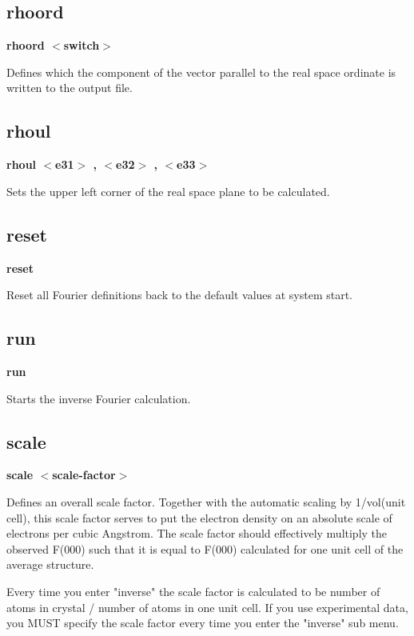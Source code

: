 \subsection*{rhoord}
{\bf rhoord $ <$switch$> $ \par }
\par
\vspace{3pt}
Defines which the component of the vector parallel to the 
real space ordinate is written to the output file. 
\subsection*{rhoul}
{\bf rhoul $ <$e31$> $ , $ <$e32$> $ , $ <$e33$> $ \par }
\par
\vspace{3pt}
Sets the upper left corner of the real space plane to be calculated. 
\subsection*{reset}
{\bf reset \par }
\par
\vspace{3pt}
Reset all Fourier definitions back to the default values at 
system start. 
\subsection*{run}
{\bf run \par }
\par
\vspace{3pt}
Starts the inverse Fourier calculation. 
\subsection*{scale}
{\bf scale $ <$scale-factor$> $ \par }
\par
\vspace{3pt}
Defines an overall scale factor. Together with the automatic scaling 
by 1/vol(unit cell), this scale factor serves to put the electron 
density on an absolute scale of electrons per cubic Angstrom. The 
scale factor should effectively multiply the observed F(000) such that 
it is equal to F(000) calculated for one unit cell of the average 
structure. 
\par
Every time you enter "inverse" the scale factor is calculated to be 
number of atoms in crystal / number of atoms in one unit cell. If you 
use experimental data, you MUST specify the scale factor every time you 
enter the "inverse" sub menu. 
